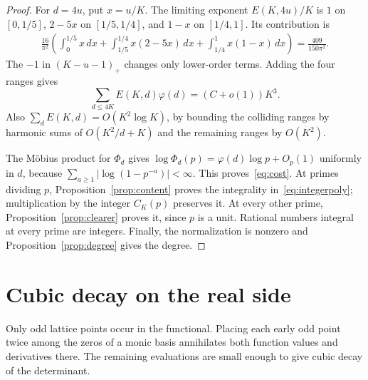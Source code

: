 \documentclass[11pt,letterpaper]{article}
\numberwithin{equation}{section}
\theoremstyle{remark}\newtheorem{remark}[theorem]{Remark}
\begin{document}
\begin{proof}
For $d=4u$, put $x=u/K$. The limiting exponent $E(K,4u)/K$ is $1$ on $[0,1/5]$, $2-5x$ on $[1/5,1/4]$, and $1-x$ on $[1/4,1]$. Its contribution is
\begin{align*}
 \frac{16}{\pi^2}\left(
 \int_0^{1/5}x\,dx+
 \int_{1/5}^{1/4}x(2-5x)\,dx+
 \int_{1/4}^{1}x(1-x)\,dx\right)
 =\frac{409}{150\pi^2}.
\end{align*}
The $-1$ in $(K-u-1)_+$ changes only lower-order terms. Adding the four ranges gives
\begin{equation*}
 \sum_{d\le4K}E(K,d)\varphi(d)=(C+o(1))K^3.
\end{equation*}
Also $\sum_d E(K,d)=O(K^2\log K)$, by bounding the colliding ranges by harmonic sums of $O(K^2/d+K)$ and the remaining ranges by $O(K^2)$.

The M\"obius product for $\Phi_d$ gives
$\log\Phi_d(p)=\varphi(d)\log p+O_p(1)$ uniformly in $d$, because $\sum_{a\ge1}|\log(1-p^{-a})|<\infty$. This proves~\eqref{eq:cost}.
At primes dividing $p$, Proposition~\ref{prop:content} proves the integrality in~\eqref{eq:integerpoly}; multiplication by the integer $C_K(p)$ preserves it. At every other prime, Proposition~\ref{prop:clearer} proves it, since $p$ is a unit. Rational numbers integral at every prime are integers. Finally, the normalization is nonzero and Proposition~\ref{prop:degree} gives the degree.
\end{proof}

\section{Cubic decay on the real side}
Only odd lattice points occur in the functional. Placing each early odd point twice among the zeros of a monic basis annihilates both function values and derivatives there. The remaining evaluations are small enough to give cubic decay of the determinant.
\end{document}
